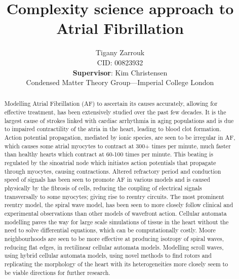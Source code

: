 \documentclass[twocolumn, a1paper]{article}
\begin{document}
\title {\textbf{ Complexity science approach to Atrial Fibrillation}}
\author{Tigany Zarrouk\\ CID: 00823932\\\textbf{Supervisor}: Kim Christensen \\ Condensed Matter Theory Group---Imperial College London}

\date{}
\maketitle





\begin{abstract}

Modelling Atrial Fibrillation (AF) to ascertain its causes accurately, allowing for effective treatment, has been extensively studied over the past few decades. It is the largest cause of strokes linked with cardiac arrhythmia in aging populations and is due to impaired contractility of the atria in the heart, leading to blood clot formation. Action potential propagation, mediated by ionic species, are seen to be irregular in AF, which causes some atrial myocytes to contract at 300+ times per minute, much faster than healthy hearts which contract at 60-100 times per minute. This beating is regulated by the sinoatrial node which initiates action potentials that propagate through myocytes, causing contractions. Altered refractory period and conduction speed of signals has been seen to promote AF in various models and is caused physically by the fibrosis of cells, reducing the coupling of electrical signals transversally to some myocytes; giving rise to reentry circuits. The most prominent reentry model, the spiral wave model, has been seen to more closely follow clinical and experimental observations than other models of wavefront action. Cellular automata modelling paves the way for large scale simulations of tissue in the heart without the need to solve differential equations, which can be computationally costly. Moore neighbourhoods are seen to be more effective at producing isotropy of spiral waves, reducing flat edges, in rectilinear cellular automata models. Modelling scroll waves, using hybrid cellular automata models, using novel methods to find rotors and replicating the morphology of the heart with its heterogeneities more closely seem to be viable directions for further research. 

\end{abstract}
\end{document}
